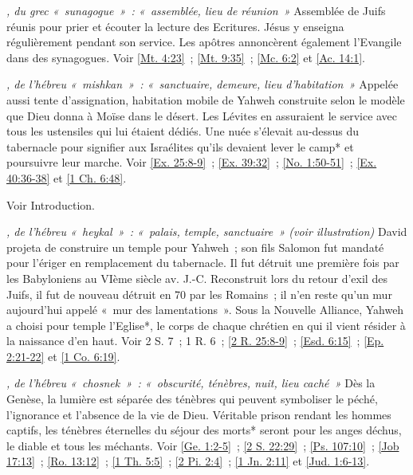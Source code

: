 \begin{multicols}{2}
\textit{, du grec «~sunagogue~»~: «~assemblée, lieu de réunion~»}\newline
Assemblée de Juifs réunis pour prier et écouter la lecture des Ecritures. Jésus y enseigna régulièrement pendant son service. Les apôtres annoncèrent également l'Evangile dans des synagogues.\newline
Voir \vref{Mt. 4:23}~; \vref{Mt. 9:35}~; \vref{Mc. 6:2} et \vref{Ac. 14:1}.

\textit{, de l'hébreu «~mishkan~»~: «~sanctuaire, demeure, lieu d'habitation~»}\newline
Appelée aussi tente d'assignation, habitation mobile de Yahweh construite selon le modèle que Dieu donna à Moïse dans le désert. Les Lévites en assuraient le service avec tous les ustensiles qui lui étaient dédiés. Une nuée s'élevait au-dessus du tabernacle pour signifier aux Israélites qu'ils devaient lever le camp* et poursuivre leur marche. Voir \vref{Ex. 25:8-9}~; \vref{Ex. 39:32}~; \vref{No. 1:50-51}~; \vref{Ex. 40:36-38} et \vref{1 Ch. 6:48}.

\textit{}\newline
Voir Introduction.

\textit{, de l'hébreu «~heykal~»~: «~palais, temple, sanctuaire~» (voir illustration)}\newline
David projeta de construire un temple pour Yahweh~; son fils Salomon fut mandaté pour l'ériger en remplacement du tabernacle. Il fut détruit une première fois par les Babyloniens au VIème siècle av. J.-C. Reconstruit lors du retour d'exil des Juifs, il fut de nouveau détruit en 70 par les Romains~; il n'en reste qu'un mur aujourd'hui appelé «~mur des lamentations~». Sous la Nouvelle Alliance, Yahweh a choisi pour temple l'Eglise*, le corps de chaque chrétien en qui il vient résider à la naissance d'en haut.\newline
Voir 2 S. 7~; 1 R. 6~; \vref{2 R. 25:8-9}~; \vref{Esd. 6:15}~; \vref{Ep. 2:21-22} et \vref{1 Co. 6:19}.

\textit{, de l'hébreu «~chosnek~»~: «~obscurité, ténèbres, nuit, lieu caché~»}\newline
Dès la Genèse, la lumière est séparée des ténèbres qui peuvent symboliser le péché, l'ignorance et l'absence de la vie de Dieu. Véritable prison rendant les hommes captifs, les ténèbres éternelles du séjour des morts* seront pour les anges déchus, le diable et tous les méchants.\newline
Voir \vref{Ge. 1:2-5}~; \vref{2 S. 22:29}~; \vref{Ps. 107:10}~; \vref{Job 17:13}~; \vref{Ro. 13:12}~; \vref{1 Th. 5:5}~; \vref{2 Pi. 2:4}~; \vref{1 Jn. 2:11} et \vref{Jud. 1:6-13}.


\end{multicols}
